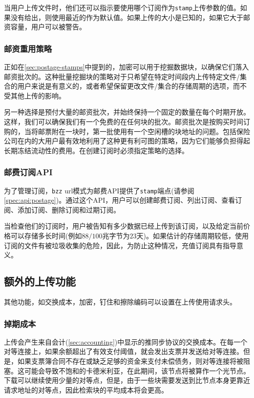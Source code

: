 当用户上传文件时，他们还可以指示要使用哪个订阅作为\lstinline{stamp}上传参数的值。如果没有给出，则使用最近的作为默认值。如果上传的大小是已知的，如果它大于邮资容量，用户可以被警告。 

\subsubsection{邮资重用策略}

正如在\ref{sec:postage-stamps}中提到的，加密可以用于挖掘数据块，以确保它们落入邮资批次的。这种批量挖掘块的策略对于只希望在特定时间段内上传特定文件/集合的用户来说是有意义的，或者希望保留更改文件/集合的存储周期的选项，而不受其他上传的影响。

另一种选择是预付大量的邮资批次，并始终保持一个固定的数量在每个时期开放。这样，我们可以确保我们有一个免费的在任何块的批次。邮资批次是按购买时间订购的，当将邮票附在一块时，第一批使用有一个空闲槽的块地址的问题。包括保险公司在内的大用户最有效地利用了这种更有利可图的策略，因为它们能够负担得起长期冻结流动性的费用。在创建订阅时必须指定策略的选择。

\subsubsection{邮费订阅API}

为了管理订阅，\lstinline{bzz} url模式为邮费API提供了\lstinline{stamp}端点(请参阅\ref{spec:api:postage})。通过这个API，用户可以创建邮费订阅、列出订阅、查看订阅、添加订阅、删除订阅和过期订阅。 

当检查他们的订阅时，用户被告知有多少数据已经上传到该订阅，以及给定当前价格可以存储多长时间(例如$88/100$兆字节为$23$天)。如果估计的存储周期较低，使用订阅的文件有被垃圾收集的危险，因此，为防止这种情况，充值订阅具有指导意义。


\subsection{额外的上传功能\statusgreen}\label{sec:features}

其他功能，如交换成本，加密，钉住和擦除编码可以设置在上传使用请求头。 


\subsubsection{掉期成本}

上传会产生来自会计(\ref{sec:accounting})中显示的推同步协议的交换成本。在每一个对等连接上，如果余额超出了有效支付阈值，就会发出支票并发送给对等连接。但是，如果支票簿合同不存在或缺乏足够的资金来支付未偿债务，则对等连接将被阻塞。这可能会导致不饱和的卡德米利亚，在此期间，该节点将被算作一个光节点。下载可以继续使用少量的对等点，但是，由于一些块需要发送到比节点本身更靠近请求地址的对等点，因此检索块的平均成本将会更高。 

